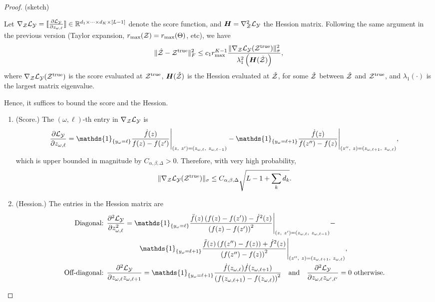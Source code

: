 \documentclass[11pt]{article}
\theoremstyle{plain}
\theoremstyle{definition}
\begin{document}
\begin{proof} (sketch)

Let $\nabla_{\mathcal{Z}}\mathcal{L}_{\mathcal{Y}}=\llbracket {\partial \mathcal{L}_{\mathcal{Y}}\over \partial z_{\omega,\ell}} \rrbracket\in\mathbb{R}^{d_1\times \cdots \times d_K\times[L-1]}$ denote the score function, and $\bm{H}=\nabla^2_{\mathcal{Z}}\mathcal{L}_{\mathcal{Y}}$ the Hession matrix. Following the same argument in the previous version (Taylor expansion, $r_{\max}(\mathcal{Z})=r_{\max}(\Theta)$, etc), we have
\begin{equation}\label{eq:boundZ}
\lVert\hat {\mathcal{Z}}-\mathcal{Z}^{\mathrm{true}}\rVert_F^2 \leq c_1r^{K-1}_{\max}{\lVert\nabla_{\mathcal{Z}}\mathcal{L}_{\mathcal{Y}}(\mathcal{Z}^{\mathrm{true}})\rVert_\sigma^2\over \lambda^2_{1} \left(\bm{H}(\check{\mathcal{Z}})\right)},
\end{equation}
where $\nabla_{\mathcal{Z}}\mathcal{L}_{\mathcal{Y}}(\mathcal{Z}^{\mathrm{true}})$ is the score evaluated at $\mathcal{Z}^{\mathrm{true}}$, $\bm{H}(\check {\mathcal{Z}})$ is the Hession evaluated at $\check{\mathcal{Z}}$, for some $\check{\mathcal{Z}}$ between $\hat {\mathcal{Z}}$ and $\mathcal{Z}^{\mathrm{true}}$, and $\lambda_{1}(\cdot)$ is the largest matrix eigenvalue. 

Hence, it suffices to bound the score and the Hession. 

\begin{enumerate}
\item (Score.) The $(\omega,\ell)$-th entry in $\nabla_{\mathcal{Z}}\mathcal{L}_{\mathcal{Y}}$ is 
\[
{\partial \tL_\tY\over \partial z_{\omega,\ell}}=\mathds{1}_{\{y_\omega=\ell\}}{\dot{f}(z)\over f(z)-f(z')}\Bigg|_{(z,\ z')=(z_{\omega,\ell},\ z_{\omega,\ell-1})} - \mathds{1}_{\{y_\omega=\ell+1\}}{\dot{f}(z)\over f(z'')-f(z)}\Bigg|_{(z'',\ z)=(z_{\omega,\ell+1},\ z_{\omega,\ell})},
\]
which is upper bounded in magnitude by $C_{\alpha,\beta,\Delta}>0$. Therefore, with very high probability,
\[
\lVert\nabla_{\mathcal{Z}}\mathcal{L}_{\mathcal{Y}}(\mathcal{Z}^{\mathrm{true}})\rVert_\sigma\leq C_{\alpha,\beta,\Delta}\sqrt{L-1+\sum_k d_k}.
\]
\item (Hession.) The entries in the Hession matrix are
\begin{align}
\text{Diagonal: }&{\partial^2 \tL_\tY\over \partial z^2_{\omega,\ell}}=\mathds{1}_{\{y_\omega=\ell\}}{\ddot{f}(z)\left(f(z)-f(z')\right)-\dot{f}^2(z)\over \left(f(z)-f(z')\right)^2}\Bigg|_{(z,\ z')=(z_{\omega,\ell},\ z_{\omega,\ell-1})}-\\
&\hspace{.65in}\mathds{1}_{\{y_\omega=\ell+1\}}{\ddot{f}(z)\left(f(z'')-f(z)\right)+\dot{f}^2(z)\over \left(f(z'')-f(z)\right)^2}\Bigg|_{(z'',\ z)=(z_{\omega,\ell+1},\ z_{\omega,\ell})},\\
\text{Off-diagonal: }&
{\partial^2 \tL_\tY\over \partial z_{\omega,\ell}z_{\omega,\ell+1}}=\mathds{1}_{\{y_\omega=\ell+1\}}{\dot{f}(z_{\omega,\ell})\dot{f}(z_{\omega,\ell+1})\over \left(f(z_{\omega,\ell+1})-f(z_{\omega,\ell})\right)^2}\quad \text{and}\quad {\partial^2 \tL_\tY\over \partial z_{\omega,\ell}z_{\omega',\ell'}}=0 \text{ otherwise}. 
\end{align}


\end{enumerate}
\end{proof}
\end{document}
